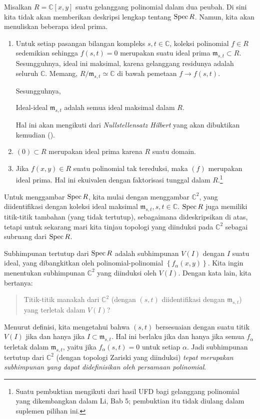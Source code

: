 \begin{example} \label{twovarpoly}
Misalkan $R = \mathbb{C}[x,y]$ suatu gelanggang polinomial dalam dua peubah.
Di sini kita tidak akan memberikan deskripsi lengkap tentang $\operatorname{Spec} R$. Namun, kita akan menuliskan
beberapa
ideal prima.

\begin{enumerate}
\item Untuk setiap pasangan bilangan kompleks $s,t \in \mathbb{C}$,
koleksi polinomial
$f \in R$ sedemikian sehingga $f(s,t) = 0$ merupakan suatu ideal prima $\mathfrak{m}
_{s,t} \subset R$. Sesungguhnya,
ideal ini maksimal, karena gelanggang residunya adalah seluruh
$\mathbb{C}$. Memang,
$R/\mathfrak{m}_{s,t} \simeq \mathbb{C}$ di bawah pemetaan $f \to
f(s,t)$.

Sesungguhnya, 
\begin{theorem}
Ideal-ideal $\mathfrak{m}_{s,t}$ adalah semua ideal maksimal dalam $R$.
\end{theorem} 
Hal ini akan mengikuti dari \emph{Nullstellensatz Hilbert} yang akan
dibuktikan kemudian
().
\item $(0) \subset R$ merupakan ideal prima karena $R$ suatu domain. 
\item Jika $f(x,y) \in R$ suatu polinomial tak tereduksi, maka $(f)$
merupakan ideal
prima. Hal ini ekuivalen dengan faktorisasi tunggal dalam
$R$.\footnote{Suatu pembuktian mengikuti dari hasil UFD bagi gelanggang polinomial yang dikembangkan dalam Li, Bab 5; pembuktian itu tidak diulang dalam suplemen pilihan ini.}  
\end{enumerate}

Untuk menggambar $\operatorname{Spec} R$, kita mulai dengan menggambar $\mathbb{C}^2$, yang diidentifikasi
dengan
koleksi
ideal maksimal $\mathfrak{m}_{s,t}, s, t \in \mathbb{C}$. $\operatorname{Spec} R$ juga memiliki
titik-titik tambahan (yang tidak tertutup),
sebagaimana
dideskripsikan di atas, tetapi untuk sekarang mari kita
tinjau topologi yang diinduksi pada $\mathbb{C}^2$ sebagai subruang dari
$\operatorname{Spec} R$.

Subhimpunan tertutup dari $\operatorname{Spec} R$ adalah subhimpunan $V(I)$ dengan $I$
suatu ideal,
yang dibangkitkan oleh polinomial-polinomial $\left\{f_{\alpha}(x,y)\right\}$. Kita ingin
menentukan subhimpunan $\mathbb{C}^2$ yang
diinduksi oleh $V(I)$.
Dengan kata lain, kita bertanya:
\begin{quote}
Titik-titik manakah dari $\mathbb{C}^2$ (dengan $(s,t)$ diidentifikasi dengan
$\mathfrak{m}_{s,t}$) yang terletak dalam $V(I)$?
\end{quote}
Menurut definisi, kita mengetahui bahwa $(s,t)$ bersesuaian dengan suatu titik $V(I)$ jika
dan hanya jika $I
\subset \mathfrak{m}_{s,t}$.
Hal ini berlaku jika dan hanya jika semua
$f_{\alpha} $ terletak dalam $ \mathfrak{m}_{s,t}$, yaitu jika
$f_{\alpha}(s,t) =0$ untuk setiap
$\alpha$. Jadi subhimpunan tertutup dari $\mathbb{C}^2$ (dengan
topologi Zariski
yang diinduksi) \emph{tepat merupakan subhimpunan
yang dapat didefinisikan oleh persamaan polinomial}.


\end{example}
